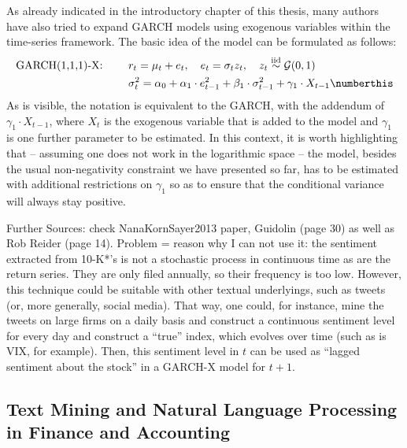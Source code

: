 As already indicated in the introductory chapter of this thesis, many authors have also tried to expand GARCH models using exogenous variables within the time-series framework. The basic idea of the model can be formulated as follows:
\begin{align*}
\text{GARCH(1,1,1)-X: }\qquad & r_t = \mu_{t} + e_{t}, \quad e_{t} = \sigma_{t} z_{t},\quad  z_{t} \overset{\text{iid}}{\sim} \mathcal{G}(0,1) \\
& \sigma_t^2 = \alpha_0 + \alpha_1 \cdot e_{t-1}^2 + \beta_1 \cdot \sigma_{t-1}^2 + \gamma_1 \cdot X_{t-1}  \label{eq: GARCHX} \numberthis
\end{align*}
As is visible, the notation is equivalent to the GARCH, with the addendum of $\gamma_1 \cdot X_{t-1}$, where $X_t$ is the exogenous variable that is added to the model and $\gamma_1$ is one further parameter to be estimated. In this context, it is worth highlighting that -- assuming one does not work in the logarithmic space -- the model, besides the usual non-negativity constraint we have presented so far, has to be estimated with additional restrictions on $\gamma_1$ so as to ensure that the conditional variance will always stay positive. 

Further Sources: check NanaKornSayer2013 paper, Guidolin (page 30) as well as Rob Reider (page 14).
Problem = reason why I can not use it: the sentiment extracted from 10-K*'s is not a stochastic process in continuous time as are the return series. They are only filed annually, so their frequency is too low. However, this technique could be suitable with other textual underlyings, such as tweets (or, more generally, social media). That way, one could, for instance, mine the tweets on large firms on a daily basis and construct a continuous sentiment level for every day and construct a \enquote{true} index, which evolves over time (such as is VIX, for example). Then, this sentiment level in $t$ can be used as \enquote{lagged sentiment about the stock} in a GARCH-X model for $t+1$.


\subsection{Text Mining and Natural Language Processing in Finance and Accounting}
\label{ssec: lit_rev_TM_NLP}

